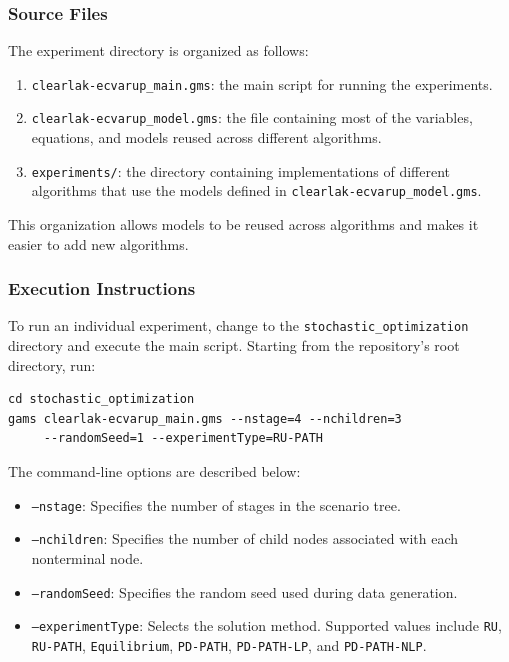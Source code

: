 \subsubsection{Source Files}

The experiment directory is organized as follows:
\begin{enumerate}
    \item \texttt{clearlak-ecvarup\_main.gms}: the main script for running the experiments.
    \item \texttt{clearlak-ecvarup\_model.gms}: the file containing most of the variables, equations, and models reused across different algorithms.
    \item \texttt{experiments/}: the directory containing implementations of different algorithms that use the models defined in \texttt{clearlak-ecvarup\_model.gms}.
\end{enumerate}

This organization allows models to be reused across algorithms and makes it easier to add new algorithms.

\subsubsection{Execution Instructions}

To run an individual experiment, change to the \texttt{stochastic\_optimization} directory and execute the main script. Starting from the repository's root directory, run:

\begin{verbatim}
cd stochastic_optimization
gams clearlak-ecvarup_main.gms --nstage=4 --nchildren=3 
     --randomSeed=1 --experimentType=RU-PATH
\end{verbatim}

The command-line options are described below:

\begin{itemize}
    \item \texttt{--nstage}: Specifies the number of stages in the scenario tree.
    \item \texttt{--nchildren}: Specifies the number of child nodes associated with each nonterminal node.
    \item \texttt{--randomSeed}: Specifies the random seed used during data generation.
    \item \texttt{--experimentType}: Selects the solution method. Supported values include \texttt{RU}, \texttt{RU-PATH}, \texttt{Equilibrium}, \texttt{PD-PATH}, \texttt{PD-PATH-LP}, and \texttt{PD-PATH-NLP}.
\end{itemize}

